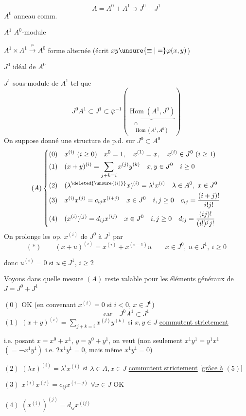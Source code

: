 \[
A=A^0+A^1\supset J^0+J^1
\]
$A^0$ anneau comm.

$A^1$ $A^0$-module

$A^1\times A^1\xrightarrow{\varphi}A^0$ forme alternée (écrit $xy\unsure{\equiv|=}\varphi(x,y)$)

$J^0$ idéal de $A^0$

$J^1$  sous-module de $A^1$ tel que
\[
J^0A^1\subset J^1\subset\overline\varphi^{-1}\left(\underset{\substack{\cap\\\operatorname{Hom}(A^1,A^0)}}{\underbrace{\operatorname{Hom}(A^1,J^0)}}\right)
\]
On suppose donné une structure de p.d. sur $J^0\subset A^0$
\[
(A)\left\{\begin{aligned}
(0)\quad&x^{(i)}\ (i\geq0)\quad x^0=1,\quad x^{(1)}=x,\quad x^{(i)}\in J^0\ (i\geq1)\\
(1)\quad&(x+y)^{(i)}=\sum_{j+k=i}x^{(j)}y^{(k)}\quad x,y\in J^0\quad i\geq0\\
(2)\quad&(\lambda^{\deleted{\unsure{(i)}}}x)^{(i)}=\lambda^i x^{(i)}\quad\lambda\in A^0,\ x\in J^0\\
(3)\quad&x^{(i)}x^{(j)}=c_{ij}x^{(i+j)}\quad x\in J^0\quad i,j\geq0\quad c_{ij}=\frac{(i+j)!}{i!j!}\\
(4)\quad&(x^{(i)})^{(j)}=d_{ij}x^{(ij)}\quad x\in J^0\quad i,j\geq0\quad d_{ij}=\frac{(ij)!}{(i!)^j j!}
\end{aligned}\right.
\]
On prolonge les op. $x^{(i)}$ de $J^0$ à  $J^1$ par
\[
(*)\qquad(x+u)^{(i)}=x^{(i)}+x^{(i-1)}u\qquad x\in J^0,\ u\in J^1,\ i\geq0
\]

donc $u^{(i)}=0$ si $u\in J^1$, $i\geq2$

Voyons dans quelle mesure $(A)$ reste valable pour les éléments généraux de $J=J^0+J^1$

$(0)$ OK (en convenant $x^{(i)}=0$ si $i<0$, $x\in J^0$)
\[
\text{car}\quad J^0A^1\subset J^1
\]
$(1)$ $(x+y)^{(i)}=\sum_{j+k=i}x^{(j)}y^{(k)}$ si $x,y\in J$ \uline{commutent strictement}


i.e. posant $x=x^0+x^1$, $y=y^0+y^1$, on veut (non seulement $x^1y^1=y^1x^1$  $(=-x^1y^1)$ i.e. $2x^1y^1=0$, mais même $x^1y^1=0$)

$(2)$ $(\lambda x)^{(i)}=\lambda^i x^{(i)}$ si $\lambda\in A,x\in J$ \uline{commutent strictement} [\uline{grâce à} $(5)$]

$(3)$  $x^{(i)}x^{(j)}=c_{ij}x^{(i+j)}$ \hfill $\forall x\in J$ OK

$(4)$ $(x^{(i)})^{(j)}=d_{ij}x^{(ij)}$
